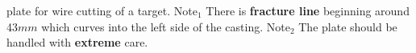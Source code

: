 \label{fig:Casting} \MgZnCa plate for wire cutting of a target. Note$_{1}$ There is \textbf{fracture line} beginning around 43$mm$ which curves into the left side of the casting. Note$_{2}$ The plate should be handled with \textbf{extreme} care.